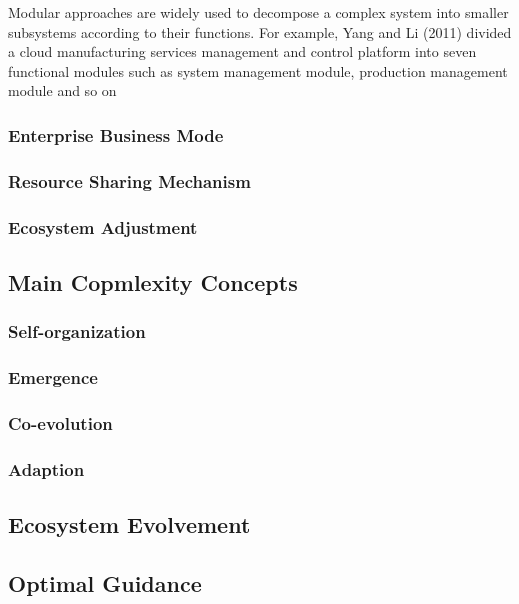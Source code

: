 Modular approaches are widely used to decompose a complex system into smaller subsystems according to their functions. For example, Yang and Li (2011) divided a cloud manufacturing services management and control platform into seven functional modules such as system management module, production management module and so on

\subsubsection{Enterprise Business Mode}

\subsubsection{Resource Sharing Mechanism}

\subsubsection{Ecosystem Adjustment}


\subsection{Main Copmlexity Concepts} %
\label{sub:main_copmlexity_concepts}

\subsubsection{Self-organization}

\subsubsection{Emergence}

\subsubsection{Co-evolution}

\subsubsection{Adaption}

\subsection{Ecosystem Evolvement} %
\label{sub:ecosystem_evolvement}


\subsection{Optimal Guidance} %
\label{sub:optimal_guidance}


